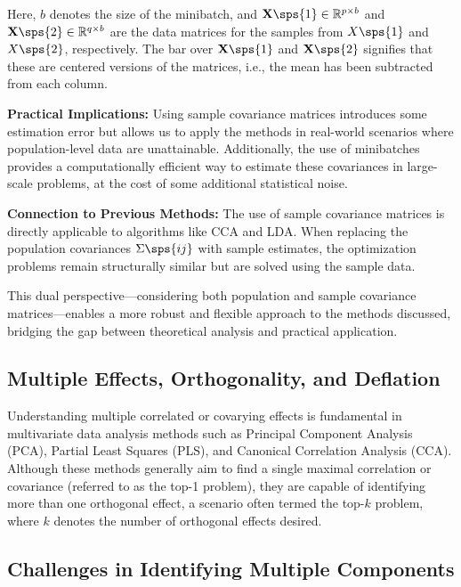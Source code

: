 Here, \(b\) denotes the size of the minibatch, and \(\mathbf{X}\sps{1} \in \mathbb{R}^{p \times b}\) and \(\mathbf{X}\sps{2} \in \mathbb{R}^{q \times b}\) are the data matrices for the samples from \(X\sps{1}\) and \(X\sps{2}\), respectively. The bar over \(\mathbf{X}\sps{1}\) and \(\mathbf{X}\sps{2}\) signifies that these are centered versions of the matrices, i.e., the mean has been subtracted from each column.

\textbf{Practical Implications:} Using sample covariance matrices introduces some estimation error but allows us to apply the methods in real-world scenarios where population-level data are unattainable. Additionally, the use of minibatches provides a computationally efficient way to estimate these covariances in large-scale problems, at the cost of some additional statistical noise.

\textbf{Connection to Previous Methods:} The use of sample covariance matrices is directly applicable to algorithms like CCA and LDA. When replacing the population covariances \(\Sigma\sps{ij}\) with sample estimates, the optimization problems remain structurally similar but are solved using the sample data.

This dual perspective—considering both population and sample covariance matrices—enables a more robust and flexible approach to the methods discussed, bridging the gap between theoretical analysis and practical application.

\subsection{Multiple Effects, Orthogonality, and Deflation}\label{subsec:orthogonality}

Understanding multiple correlated or covarying effects is fundamental in multivariate data analysis methods such as Principal Component Analysis (PCA), Partial Least Squares (PLS), and Canonical Correlation Analysis (CCA). Although these methods generally aim to find a single maximal correlation or covariance (referred to as the top-1 problem), they are capable of identifying more than one orthogonal effect, a scenario often termed the top-$k$ problem, where $k$ denotes the number of orthogonal effects desired.

\subsection{Challenges in Identifying Multiple Components}

